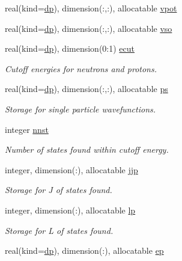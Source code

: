 \begin{DoxyCompactItemize}
\item 
real(kind=\mbox{\hyperlink{namespaceparameters_a52f8c6351fd79345d8811e065bcbbb37}{dp}}), dimension(\+:,\+:), allocatable \mbox{\hyperlink{group__STRUTINSKY_gab6a00a0a328c2e57dbb345301d691e78}{vpot}}
\item 
real(kind=\mbox{\hyperlink{namespaceparameters_a52f8c6351fd79345d8811e065bcbbb37}{dp}}), dimension(\+:,\+:), allocatable \mbox{\hyperlink{group__STRUTINSKY_gaf3ea0455435866d9d7095b02b9e40436}{vso}}
\item 
real(kind=\mbox{\hyperlink{namespaceparameters_a52f8c6351fd79345d8811e065bcbbb37}{dp}}), dimension(0\+:1) \mbox{\hyperlink{group__STRUTINSKY_gad6c6de2d2e65ad858f92af1a84c8b24b}{ecut}}
\begin{DoxyCompactList}\small\item\em Cutoff energies for neutrons and protons. \end{DoxyCompactList}\item 
real(kind=\mbox{\hyperlink{namespaceparameters_a52f8c6351fd79345d8811e065bcbbb37}{dp}}), dimension(\+:,\+:), allocatable \mbox{\hyperlink{group__STRUTINSKY_gace20a26f9d6d1c052703baf791c04716}{ps}}
\begin{DoxyCompactList}\small\item\em Storage for single particle wavefunctions. \end{DoxyCompactList}\item 
integer \mbox{\hyperlink{group__STRUTINSKY_gae6e7b96f6ed3aba1ba90ec3567d8e83d}{nnst}}
\begin{DoxyCompactList}\small\item\em Number of states found within cutoff energy. \end{DoxyCompactList}\item 
integer, dimension(\+:), allocatable \mbox{\hyperlink{group__STRUTINSKY_ga73b3d3e4bef13fcc24049d5e9fe16bb2}{jjp}}
\begin{DoxyCompactList}\small\item\em Storage for J of states found. \end{DoxyCompactList}\item 
integer, dimension(\+:), allocatable \mbox{\hyperlink{group__STRUTINSKY_gaff7c4f2e2ade60a6581e2335dca2eda3}{lp}}
\begin{DoxyCompactList}\small\item\em Storage for L of states found. \end{DoxyCompactList}\item 
real(kind=\mbox{\hyperlink{namespaceparameters_a52f8c6351fd79345d8811e065bcbbb37}{dp}}), dimension(\+:), allocatable \mbox{\hyperlink{group__STRUTINSKY_gaa02842b39c139c8fe6da09650a18113a}{ep}}

\end{DoxyCompactItemize}
